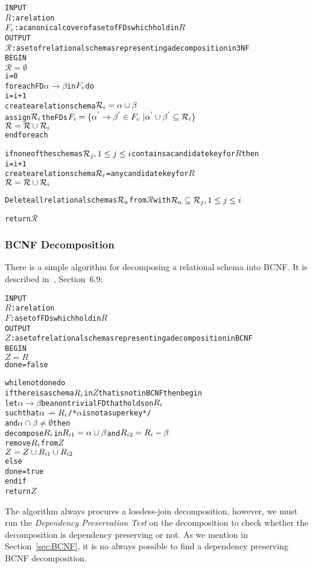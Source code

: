 \begin{alltt}
INPUT 
  \(R\)  : a relation
  \(F\sb{c}\) : a canonical cover of a set of FDs which hold in \(R\)
OUTPUT 
  \(\mathcal{R}\) : a set of relational schemas representing a decomposition in 3NF 
BEGIN
  \(\mathcal{R} = \emptyset\)
  i = 0
  foreach FD \(\alpha \rightarrow \beta\) in \(F\sb{c}\) do
    i = i + 1
    create a relation schema \(\mathcal{R}\sb{i} = \alpha \cup \beta\)
    assign \(\mathcal{R}\sb{i}\) the FDs  \(F\sb{i} = \{\alpha\sp{'} \rightarrow \beta\sp{'} \in F\sb{c}\ | \alpha\sp{'} \cup \beta\sp{'} \subseteq \mathcal{R}\sb{i}\}\)
    \(\mathcal{R} = \mathcal{R} \cup \mathcal{R}\sb{i}\)
  end foreach
  
  if none of the schemas \(\mathcal{R}\sb{j}, 1 \leq j \leq i\) contains a candidate key for \(R\) then
    i = i + 1
    create a relation schema \(\mathcal{R}\sb{i}\) = any candidate key for \(R\)
    \(\mathcal{R} = \mathcal{R} \cup \mathcal{R}\sb{i}\)
    
  Delete all relational schemas \(\mathcal{R}\sb{a}\) from \(\mathcal{R}\) with \(\mathcal{R}\sb{a} \subseteq \mathcal{R}\sb{j},  1 \leq j \leq i\)
  
  return \(\mathcal{R}\)
\end{alltt}

\subsubsection{BCNF Decomposition}
There is a simple algorithm for decomposing a relational schema into BCNF.
It is described in~\cite{bdb2}, Section~6.9:

\begin{alltt}
INPUT
  \(R\) : a relation
  \(F\) : a set of FDs which hold in \(R\)
OUTPUT
  \(Z\) : a set of relational schemas representing a decomposition in BCNF 
BEGIN
\(Z = R\)
done = false

while not done do
  if there is a schema \(R\sb{i}\) in \(Z\)  that is not in BCNF then begin
    let \(\alpha \rightarrow \beta\) be a nontrivial FD that holds on \(R\sb{i}\)
      such that \(\alpha \nrightarrow R\sb{i}\) /* \(\alpha\) is not a superkey */
      and  \(\alpha \cap \beta \neq \emptyset\) then  
        decompose \(R\sb{i}\) in \(R\sb{i1} = \alpha \cup \beta\) and \(R\sb{i2} = R\sb{i} - \beta\)
        remove \(R\sb{i}\) from \(Z\) 
        \(Z = Z \cup R\sb{i1} \cup R\sb{i2}\)
  else 
    done = true
  end if 
return \(Z\)
\end{alltt}

The algorithm always 
procures a lossless-join decomposition, however, we must run the \textit{Dependency Preservation Test} on
the decomposition to check whether the decomposition is dependency preserving or not. As we mention in Section~\ref{sec:BCNF},
it is no always possible to find a dependency preserving BCNF decomposition.

